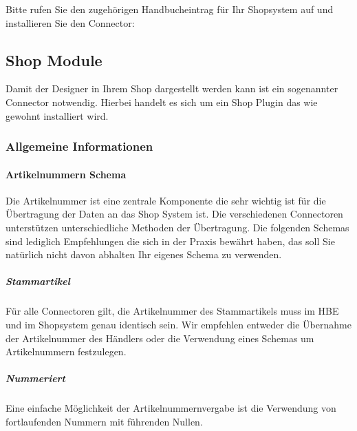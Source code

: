 \documentclass[letterpaper,10pt,ngerman]{sphinxmanual}
\begin{document}
Bitte rufen Sie den zugehörigen Handbucheintrag für Ihr Shopsystem auf und installieren Sie den Connector:


\subsection{Shop Module}
\label{\detokenize{modules/index:shop-module}}\label{\detokenize{modules/index::doc}}
Damit der Designer in Ihrem Shop dargestellt werden kann ist ein sogenannter Connector notwendig. Hierbei handelt es sich
um ein Shop Plugin das wie gewohnt installiert wird.


\subsubsection{Allgemeine Informationen}
\label{\detokenize{modules/general/index:allgemeine-informationen}}\label{\detokenize{modules/general/index::doc}}

\paragraph{Artikelnummern Schema}
\label{\detokenize{modules/general/skuscheme:artikelnummern-schema}}\label{\detokenize{modules/general/skuscheme::doc}}
Die Artikelnummer ist eine zentrale Komponente die sehr wichtig ist für die Übertragung der Daten an das Shop System ist.
Die verschiedenen Connectoren unterstützen unterschiedliche Methoden der Übertragung.
Die folgenden Schemas sind lediglich Empfehlungen die sich in der Praxis bewährt haben,
das soll Sie natürlich nicht davon abhalten Ihr eigenes Schema zu verwenden.


\subparagraph{Stammartikel}
\label{\detokenize{modules/general/skuscheme:stammartikel}}
Für alle Connectoren gilt, die Artikelnummer des Stammartikels muss im HBE und im Shopsystem genau identisch sein.
Wir empfehlen entweder die Übernahme der Artikelnummer des Händlers oder
die Verwendung eines Schemas um Artikelnummern festzulegen.


\subparagraph{Nummeriert}
\label{\detokenize{modules/general/skuscheme:nummeriert}}
Eine einfache Möglichkeit der Artikelnummernvergabe ist die Verwendung von
fortlaufenden Nummern mit führenden Nullen.

\begin{sphinxVerbatim}[commandchars=\\\{\}]
\end{sphinxVerbatim}
\end{document}
